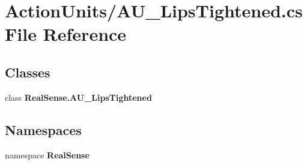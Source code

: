 \section{Action\+Units/\+A\+U\+\_\+\+Lips\+Tightened.cs File Reference}
\label{_a_u___lips_tightened_8cs}
\subsection*{Classes}
\begin{DoxyCompactItemize}
\item 
class \textbf{ Real\+Sense.\+A\+U\+\_\+\+Lips\+Tightened}
\end{DoxyCompactItemize}
\subsection*{Namespaces}
\begin{DoxyCompactItemize}
\item 
namespace \textbf{ Real\+Sense}
\end{DoxyCompactItemize}
